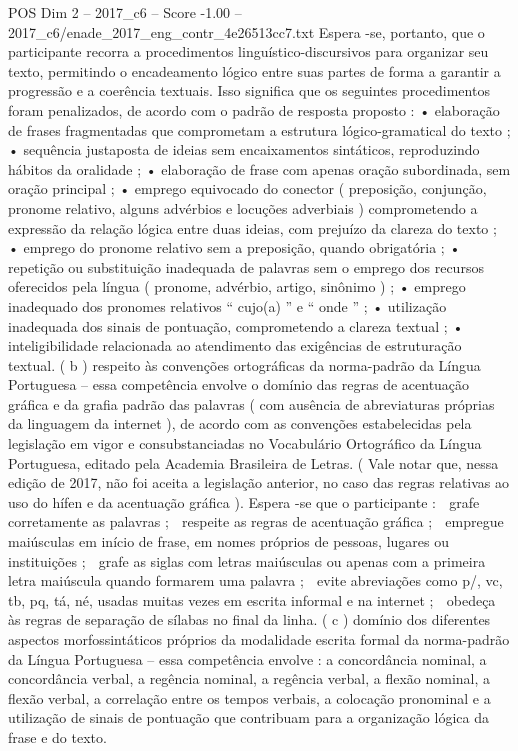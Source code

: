 \begin{textsample}{POS Dim 2 – 2017\_c6 – Score -1.00 – 2017\_c6/enade\_2017\_eng\_contr\_4e26513cc7.txt}
Espera -se, portanto, que o participante recorra a procedimentos linguístico-discursivos para organizar seu texto, permitindo o encadeamento lógico entre suas partes de forma a garantir a progressão e a coerência textuais.
Isso significa que os seguintes procedimentos foram penalizados, de acordo com o padrão de resposta proposto : • elaboração de frases fragmentadas que comprometam a estrutura lógico-gramatical do texto ; • sequência justaposta de ideias sem encaixamentos sintáticos, reproduzindo hábitos da oralidade ; • elaboração de frase com apenas oração subordinada, sem oração principal ; • emprego equivocado do conector ( preposição, conjunção, pronome relativo, alguns advérbios e locuções adverbiais ) comprometendo a expressão da relação lógica entre duas ideias, com prejuízo da clareza do texto ; • emprego do pronome relativo sem a preposição, quando obrigatória ; • repetição ou substituição inadequada de palavras sem o emprego dos recursos oferecidos pela língua ( pronome, advérbio, artigo, sinônimo ) ; • emprego inadequado dos pronomes relativos “ cujo(a) ” e “ onde ” ; • utilização inadequada dos sinais de pontuação, comprometendo a clareza textual ; • inteligibilidade relacionada ao atendimento das exigências de estruturação textual. ( b ) respeito às convenções ortográficas da norma-padrão da Língua Portuguesa – essa competência envolve o domínio das regras de acentuação gráfica e da grafia padrão das palavras ( com ausência de abreviaturas próprias da linguagem da internet ), de acordo com as convenções estabelecidas pela legislação em vigor e consubstanciadas no Vocabulário Ortográfico da Língua Portuguesa, editado pela Academia Brasileira de Letras. ( Vale notar que, nessa edição de 2017, não foi aceita a legislação anterior, no caso das regras relativas ao uso do hífen e da acentuação gráfica ).
Espera -se que o participante :  grafe corretamente as palavras ;  respeite as regras de acentuação gráfica ;  empregue maiúsculas em início de frase, em nomes próprios de pessoas, lugares ou instituições ;  grafe as siglas com letras maiúsculas ou apenas com a primeira letra maiúscula quando formarem uma palavra ;  evite abreviações como p/, vc, tb, pq, tá, né, usadas muitas vezes em escrita informal e na internet ;  obedeça às regras de separação de sílabas no final da linha. ( c ) domínio dos diferentes aspectos morfossintáticos próprios da modalidade escrita formal da norma-padrão da Língua Portuguesa – essa competência envolve : a concordância nominal, a concordância verbal, a regência nominal, a regência verbal, a flexão nominal, a flexão verbal, a correlação entre os tempos verbais, a colocação pronominal e a utilização de sinais de pontuação que contribuam para a organização lógica da frase e do texto.

\end{textsample}
